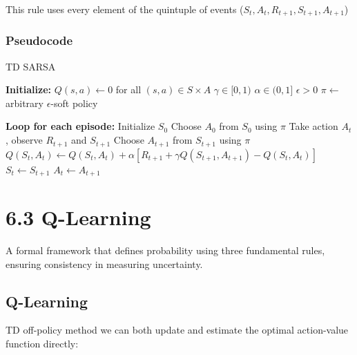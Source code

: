 \documentclass[
  letterpaper,
  DIV=11,
  numbers=noendperiod]{scrreprt}
\begin{document}
This rule uses every element of the quintuple of events
(\(S_{t}, A_{t}, R_{t+1}, S_{t+1}, A_{t+1}\))

\subsection{Pseudocode}\label{pseudocode-10}

\begin{algorithm}[htb!]
\caption{TD SARSA}
\begin{algorithmic}[1]
\State \textbf{Initialize:} 
\State $Q(s, a) \gets 0$ for all $(s, a) \in S \times A$
\State $\gamma \in [0, 1)$
\State $\alpha \in (0, 1]$
\State $\epsilon > 0$
\State $\pi \gets$ arbitrary $\epsilon$-soft policy

\State \textbf{Loop for each episode:}
\State Initialize $S_{0}$
\State Choose $A_{0}$ from $S_{0}$ using $\pi$
\Repeat
    \State Take action $A_{t}$, observe $R_{t+1}$ and $S_{t+1}$
    \State Choose $A_{t+1}$ from $S_{t+1}$ using $\pi$
    \State $Q(S_{t}, A_{t}) \gets Q(S_{t}, A_{t}) + \alpha \left[R_{t+1} + \gamma Q(S_{t+1}, A_{t+1}) - Q(S_{t}, A_{t})\right]$
    \State $S_{t} \gets S_{t+1}$
    \State $A_{t} \gets A_{t+1}$

\end{algorithmic}
\end{algorithm}

\chapter{6.3 Q-Learning}\label{q-learning}

\begin{tcolorbox}[enhanced jigsaw, arc=.35mm, toprule=.15mm, leftrule=.75mm, colback=white, left=2mm, colframe=quarto-callout-note-color-frame, rightrule=.15mm, opacityback=0, breakable, bottomrule=.15mm]

A formal framework that defines probability using three fundamental
rules, ensuring consistency in measuring uncertainty. 🎲

\end{tcolorbox}

\section{Q-Learning}\label{q-learning-1}

TD off-policy method we can both update and estimate the optimal
action-value function directly:
\end{document}
